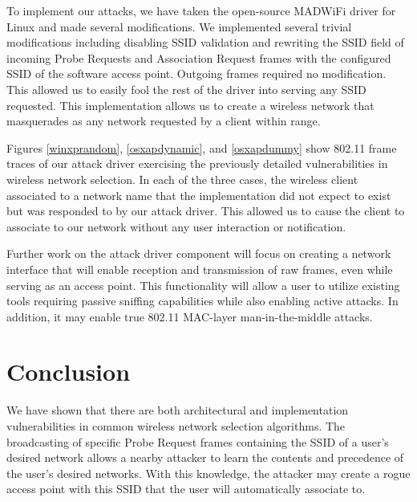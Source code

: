 \documentclass[10pt,twocolumn]{article}
\begin{document}
To implement our attacks, we have taken the open-source MADWiFi driver
for Linux \cite{leffler02madwifi} and made several modifications.  We
implemented several trivial modifications including disabling SSID
validation and rewriting the SSID field of incoming Probe Requests and
Association Request frames with the configured SSID of the software
access point.  Outgoing frames required no modification.  This allowed
us to easily fool the rest of the driver into serving any SSID
requested.  This implementation allows us to create a wireless network
that masquerades as any network requested by a client within range.

Figures \ref{winxprandom}, \ref{osxapdynamic}, and \ref{osxapdummy}
show 802.11 frame traces of our attack driver exercising the
previously detailed vulnerabilities in wireless network selection.  In
each of the three cases, the wireless client associated to a network
name that the implementation did not expect to exist but was responded
to by our attack driver.  This allowed us to cause the client to
associate to our network without any user interaction or notification.



Further work on the attack driver component will focus on creating
a network interface that will enable reception and transmission of raw
frames, even while serving as an access point.  This functionality
will allow a user to utilize existing tools requiring passive sniffing
capabilities while also enabling active attacks.  In addition, it may
enable true 802.11 MAC-layer man-in-the-middle attacks.

\section{Conclusion}
\label{conclusion}

We have shown that there are both architectural and implementation
vulnerabilities in common wireless network selection algorithms.  The
broadcasting of specific Probe Request frames containing the SSID of a
user's desired network allows a nearby attacker to learn the contents
and precedence of the user's desired networks.  With this knowledge,
the attacker may create a rogue access point with this SSID that the
user will automatically associate to.
\end{document}
